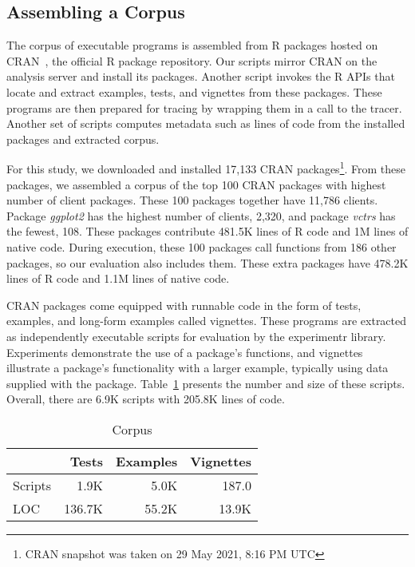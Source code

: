 \documentclass[10pt,review,sigplan,anonymous=true,authorversion=true,nonacm=true]{acmart}
\newcommand{\experimentr}{{\sf experimentr}\xspace}
\newcommand{\ggplot}{\textit{ggplot2}\xspace}
\newcommand{\vctrs}{\textit{vctrs}\xspace}
\begin{document}
\subsection{Assembling a Corpus}

The corpus of executable programs is assembled from R packages hosted on
CRAN~\cite{ligges2017}, the official R package repository. Our scripts mirror
CRAN on the analysis server and install its packages. Another script invokes the
R APIs that locate and extract examples, tests, and vignettes from these
packages. These programs are then prepared for tracing by wrapping them in a
call to the tracer. Another set of scripts computes metadata such as lines of
code from the installed packages and extracted corpus.

For this study, we downloaded and installed 17,133 CRAN packages\footnote{CRAN
  snapshot was taken on 29 May 2021, 8:16 PM UTC}. From these packages, we
assembled a corpus of the top 100 CRAN packages with highest number of client
packages. These 100 packages together have 11,786 clients. Package \ggplot has
the highest number of clients, 2,320, and package \vctrs has the fewest, 108.
These packages contribute 481.5K lines of R code and 1M lines of native code.
During execution, these 100 packages call functions from 186 other packages, so
our evaluation also includes them. These extra packages have 478.2K lines of R
code and 1.1M lines of native code.

CRAN packages come equipped with runnable code in the form of tests, examples,
and long-form examples called vignettes. These programs are extracted as
independently executable scripts for evaluation by the \experimentr library.
Experiments demonstrate the use of a package's functions, and vignettes
illustrate a package's functionality with a larger example, typically using data
supplied with the package. Table~\ref{table:corpus} presents the number and size
of these scripts. Overall, there are 6.9K scripts with 205.8K lines of code.

\begin{table}[!h]
  \vspace{-3mm}
  \small
  \centering
  \caption{Corpus}\label{table:corpus}
  \vspace{-3mm}
  \begin{tabular}{lrrr}
    \toprule
    &\bf Tests&\bf Examples&\bf Vignettes\\
    \midrule
    {Scripts}&1.9K&5.0K&187.0\\
    \midrule
    {LOC}&136.7K&55.2K&13.9K\\
    \bottomrule
  \end{tabular}
\end{table}
\end{document}
